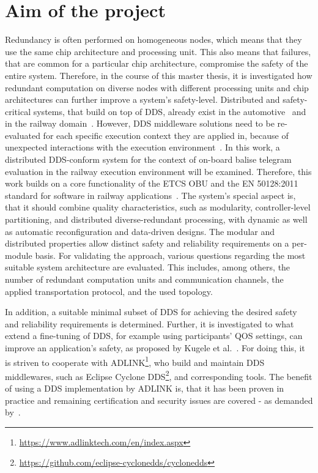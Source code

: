 \documentclass[a4paper, 12pt]{scrartcl}
\begin{document}
\section*{Aim of the project}
Redundancy is often performed on homogeneous nodes, which means that they use the same chip architecture and processing unit.
This also means that failures, that are common for a particular chip architecture, compromise the safety of the entire system.
Therefore, in the course of this master thesis, it is investigated how redundant computation on diverse nodes with different processing units and chip architectures can further improve a system's safety-level.
Distributed and safety-critical systems, that build on top of \ac{DDS}, already exist in the automotive~\cite{DistributedSafety2020} and in the railway domain~\cite{DDSInURail}.
However, \ac{DDS} middleware solutions need to be re-evaluated for each specific execution context they are applied in, because of unexpected interactions with the execution environment~\cite{CotroneoDDSFailureAnalysis}.
In this work, a distributed \ac{DDS}-conform system for the context of on-board balise telegram evaluation in the railway execution environment will be examined.
Therefore, this work builds on a core functionality of the \ac{ETCS OBU} and the EN 50128:2011 standard for software in railway applications~\cite{BoulangerStandards}.
The system's special aspect is, that it should combine quality characteristics, such as modularity, control\-ler-level partitioning, and distributed diverse-redundant processing, with dynamic as well as automatic reconfiguration and data-driven designs.
The modular and distributed properties allow distinct safety and reliability requirements on a per-module basis.
For validating the approach, various questions regarding the most suitable system architecture are evaluated.
This includes, among others, the number of redundant computation units and communication channels, the applied transportation protocol, and the used topology.

In addition, a suitable minimal subset of \ac{DDS} for achieving the desired safety and reliability requirements is determined.
Further, it is investigated to what extend a fine-tuning of \ac{DDS}, for example using participants' \ac{QOS} settings, can improve an application's safety, as proposed by Kugele et al.~\cite{KugeleDataCentricForAuto}.
For doing this, it is striven to cooperate with ADLINK\footnote{\url{https://www.adlinktech.com/en/index.aspx}}, who build and maintain \ac{DDS} middlewares, such as Eclipse Cyclone DDS\footnote{\url{https://github.com/eclipse-cyclonedds/cyclonedds}}, and corresponding tools.
The benefit of using a \ac{DDS} implementation by ADLINK is, that it has been proven in practice and remaining certification and security issues are covered - as demanded by~\cite{KugeleDataCentricForAuto}.
\end{document}

